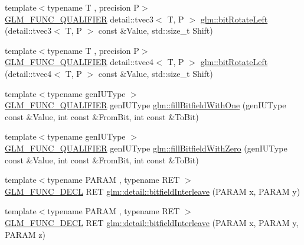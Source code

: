\begin{DoxyCompactItemize}
\item 
{\footnotesize template$<$typename T , precision P$>$ }\\\hyperlink{setup_8hpp_a33fdea6f91c5f834105f7415e2a64407}{G\+L\+M\+\_\+\+F\+U\+N\+C\+\_\+\+Q\+U\+A\+L\+I\+F\+I\+ER} detail\+::tvec3$<$ T, P $>$ \hyperlink{namespaceglm_afd830a73912ea4ec771a5d9bd09c3cd4}{glm\+::bit\+Rotate\+Left} (detail\+::tvec3$<$ T, P $>$ const \&Value, std\+::size\+\_\+t Shift)
\item 
{\footnotesize template$<$typename T , precision P$>$ }\\\hyperlink{setup_8hpp_a33fdea6f91c5f834105f7415e2a64407}{G\+L\+M\+\_\+\+F\+U\+N\+C\+\_\+\+Q\+U\+A\+L\+I\+F\+I\+ER} detail\+::tvec4$<$ T, P $>$ \hyperlink{namespaceglm_a45a6d5d1c93e455dfdfc8fee6567ab92}{glm\+::bit\+Rotate\+Left} (detail\+::tvec4$<$ T, P $>$ const \&Value, std\+::size\+\_\+t Shift)
\item 
{\footnotesize template$<$typename gen\+I\+U\+Type $>$ }\\\hyperlink{setup_8hpp_a33fdea6f91c5f834105f7415e2a64407}{G\+L\+M\+\_\+\+F\+U\+N\+C\+\_\+\+Q\+U\+A\+L\+I\+F\+I\+ER} gen\+I\+U\+Type \hyperlink{group__gtx__bit_gafac2a9e0ef0d5d2fc4e569bff2b2f452}{glm\+::fill\+Bitfield\+With\+One} (gen\+I\+U\+Type const \&Value, int const \&From\+Bit, int const \&To\+Bit)
\item 
{\footnotesize template$<$typename gen\+I\+U\+Type $>$ }\\\hyperlink{setup_8hpp_a33fdea6f91c5f834105f7415e2a64407}{G\+L\+M\+\_\+\+F\+U\+N\+C\+\_\+\+Q\+U\+A\+L\+I\+F\+I\+ER} gen\+I\+U\+Type \hyperlink{group__gtx__bit_ga0c514d45387003260783ba6a8a4f3285}{glm\+::fill\+Bitfield\+With\+Zero} (gen\+I\+U\+Type const \&Value, int const \&From\+Bit, int const \&To\+Bit)
\item 
{\footnotesize template$<$typename P\+A\+R\+AM , typename R\+ET $>$ }\\\hyperlink{setup_8hpp_ab2d052de21a70539923e9bcbf6e83a51}{G\+L\+M\+\_\+\+F\+U\+N\+C\+\_\+\+D\+E\+CL} R\+ET \hyperlink{namespaceglm_1_1detail_a39644ee418ae41e3393d1cb6191e32a7}{glm\+::detail\+::bitfield\+Interleave} (P\+A\+R\+AM x, P\+A\+R\+AM y)
\item 
{\footnotesize template$<$typename P\+A\+R\+AM , typename R\+ET $>$ }\\\hyperlink{setup_8hpp_ab2d052de21a70539923e9bcbf6e83a51}{G\+L\+M\+\_\+\+F\+U\+N\+C\+\_\+\+D\+E\+CL} R\+ET \hyperlink{namespaceglm_1_1detail_aa2fdd8f720417a13990873ba704a3426}{glm\+::detail\+::bitfield\+Interleave} (P\+A\+R\+AM x, P\+A\+R\+AM y, P\+A\+R\+AM z)

\end{DoxyCompactItemize}
